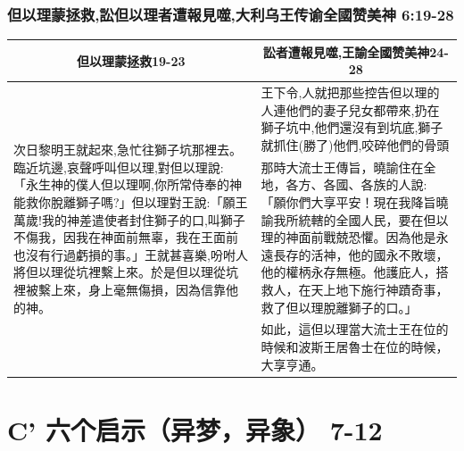 \subsubsection{但以理蒙拯救,訟但以理者遭報見噬,大利乌王传谕全國赞美神 6:19-28}
\begin{table}[H]
\centering
\begin{tabular}{p{6.5cm}|p{10.750cm}}\hline\hline
\multicolumn{1}{c|}{但以理蒙拯救19-23}&\multicolumn{1}{c}{訟者遭報見噬,王諭全國赞美神24-28}\\\hline
\multirow{3}{6.8cm}{次日黎明王就起來,急忙往獅子坑那裡去。臨近坑邊,哀聲呼叫但以理,對但以理說:「永生神的僕人但以理啊,你所常侍奉的神能救你脫離獅子嗎?」但以理對王說:「願王萬歲!我的神差遣使者封住獅子的口,叫獅子不傷我，因我在神面前無辜，我在王面前也沒有行過虧損的事。」王就甚喜樂,吩咐人將但以理從坑裡繫上來。於是但以理從坑裡被繫上來，身上毫無傷損，因為信靠他的神。}
&王下令,人就把那些控告但以理的人連他們的妻子兒女都帶來,扔在獅子坑中,他們還沒有到坑底,獅子就抓住(勝了)他們,咬碎他們的骨頭\\\cline{2-2}
&那時大流士王傳旨，曉諭住在全地，各方、各國、各族的人說:「願你們大享平安！現在我降旨曉諭我所統轄的全國人民，要在但以理的神面前戰兢恐懼。因為他是永遠長存的活神，他的國永不敗壞，他的權柄永存無極。他護庇人，搭救人，在天上地下施行神蹟奇事，救了但以理脫離獅子的口。」\\\cline{2-2}
&如此，這但以理當大流士王在位的時候和波斯王居魯士在位的時候，大享亨通。\\\hline
\end{tabular}
\end{table}


\section{C' 六个启示（异梦，异象） 7-12}

